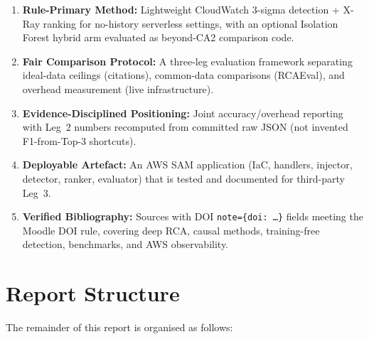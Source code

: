 \begin{enumerate}
    \item \textbf{Rule-Primary Method:} Lightweight CloudWatch 3-sigma detection + X-Ray ranking for no-history serverless settings, with an optional Isolation Forest hybrid arm evaluated as beyond-CA2 comparison code.
    
    \item \textbf{Fair Comparison Protocol:} A three-leg evaluation framework separating ideal-data ceilings (citations), common-data comparisons (RCAEval), and overhead measurement (live infrastructure).
    
    \item \textbf{Evidence-Disciplined Positioning:} Joint accuracy/overhead reporting with Leg~2 numbers recomputed from committed raw JSON (not invented F1-from-Top-3 shortcuts).
    
    \item \textbf{Deployable Artefact:} An AWS SAM application (IaC, handlers, injector, detector, ranker, evaluator) that is tested and documented for third-party Leg~3.
    
    \item \textbf{Verified Bibliography:} Sources with DOI \texttt{note=\{doi: \ldots\}} fields meeting the Moodle DOI rule, covering deep RCA, causal methods, training-free detection, benchmarks, and AWS observability.
\end{enumerate}

\section{Report Structure}

The remainder of this report is organised as follows:

